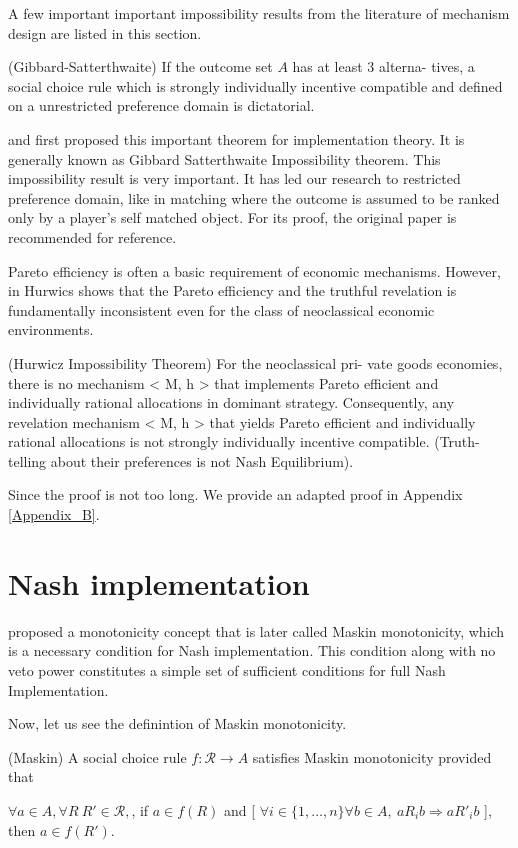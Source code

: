 A few important important impossibility results from the literature of mechanism design are listed in this section.

\begin{thm*}(Gibbard-Satterthwaite)
  \label{gibbard-satterthwaite}
If the outcome set $A$ has at least 3 alterna-
tives, a social choice rule which is strongly individually incentive compatible and
defined on a unrestricted preference domain is dictatorial.
\end{thm*}

\parencite{Gibbard1973} and \parencite{Satterthwaite1975} first proposed this important theorem for implementation theory. It is generally known as 
Gibbard Satterthwaite Impossibility theorem. This impossibility result is very important. It has led our research to restricted preference domain, like in matching where the outcome is assumed to be ranked only by a player's self matched object. For its proof, the original paper is recommended for reference.

Pareto efficiency is often a basic requirement of economic
mechanisms. However, in \parencite{Hurwicz1972}
Hurwics  shows that  the Pareto efficiency and the truthful revelation is
fundamentally inconsistent even for the class of neoclassical economic
environments.
\begin{thm*}
(Hurwicz Impossibility Theorem) For the neoclassical pri-
vate goods economies, there is no mechanism < M, h > that implements Pareto efficient
and individually rational allocations in dominant strategy. Consequently, any revelation
mechanism < M, h > that yields Pareto efficient and individually rational allocations is
not strongly individually incentive compatible. (Truth-telling about their preferences is not
Nash Equilibrium).
\end{thm*}
Since the proof is not too long. We provide
an adapted proof in Appendix \ref{Appendix_B}.


\section{Nash implementation}
\parencite{Maskin1999} proposed a monotonicity concept that is later
called Maskin monotonicity, which is a necessary condition for Nash implementation. This condition along with no veto power
constitutes a simple set of  sufficient conditions 
for full Nash Implementation. 

Now, let us see the definintion of Maskin monotonicity.

\begin{definition*}(Maskin)
A social choice rule $f: \mathscr{R} \rightarrow A$ satisfies Maskin
monotonicity provided that

$\forall a \in A, \forall R\ R' \in \mathscr{R},$, if $a \in f(R)$ and [
$\forall i \in \{1, \dots, n\} \forall b \in A  ,\  aR_i b \Rightarrow
aR'_i b$ ], then $ a \in f(R')$.
\end{definition*}

